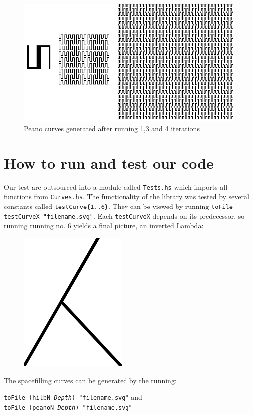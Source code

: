 \documentclass{article}
\begin{document}
\begin{figure}[h]
\caption{Peano curves generated after running 1,3 and 4 iterations}
\center
\includegraphics{PeanoAll.png}
\end{figure}

\section*{How to run and test our code}
Our test are outsourced into a module called \texttt{Tests.hs} which imports all functions from \texttt{Curves.hs}.
The functionality of the library was tested by several constants called \texttt{testCurve\{1..6\}}.
They can be viewed by running \texttt{toFile testCurveX "filename.svg"}. Each \texttt{testCurveX} depends on its
predecessor, so running running no. 6 yields a final picture,
an inverted Lambda:

\begin{figure}[h]
\centering
\includegraphics{lambda.png}
\end{figure}

The spacefilling curves can be generated by the running:

\noindent \texttt{toFile (hilbN \textit{Depth}) "filename.svg"} and \\
\texttt{toFile (peanoN \textit{Depth}) "filename.svg"}
\end{document}
